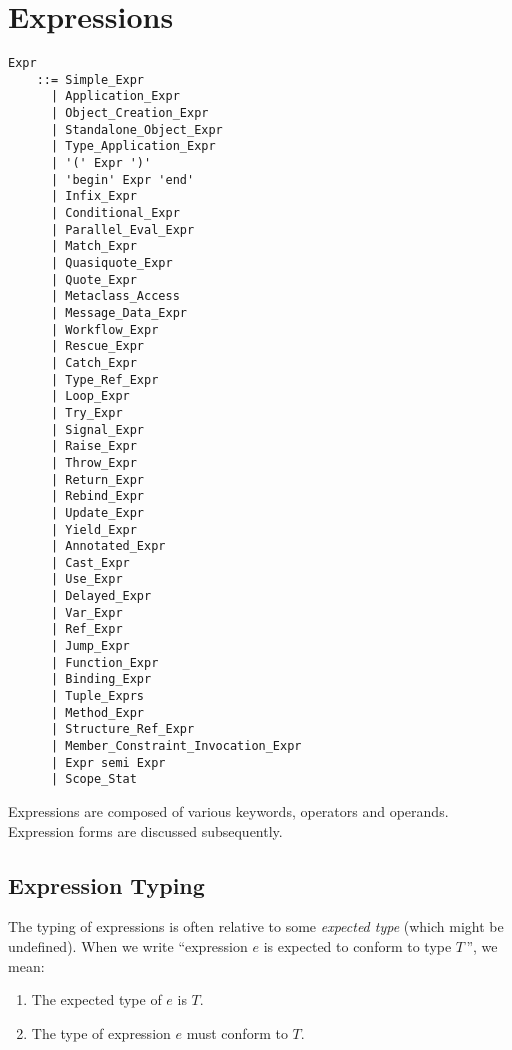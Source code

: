 
\chapter{Expressions}

\minitoc

\newpage

\grammar\begin{lstlisting}
Expr        
    ::= Simple_Expr
      | Application_Expr
      | Object_Creation_Expr
      | Standalone_Object_Expr
      | Type_Application_Expr
      | '(' Expr ')'
      | 'begin' Expr 'end'
      | Infix_Expr
      | Conditional_Expr
      | Parallel_Eval_Expr
      | Match_Expr
      | Quasiquote_Expr
      | Quote_Expr
      | Metaclass_Access
      | Message_Data_Expr
      | Workflow_Expr
      | Rescue_Expr
      | Catch_Expr
      | Type_Ref_Expr
      | Loop_Expr
      | Try_Expr
      | Signal_Expr
      | Raise_Expr
      | Throw_Expr
      | Return_Expr
      | Rebind_Expr
      | Update_Expr
      | Yield_Expr
      | Annotated_Expr
      | Cast_Expr
      | Use_Expr
      | Delayed_Expr
      | Var_Expr
      | Ref_Expr
      | Jump_Expr
      | Function_Expr
      | Binding_Expr
      | Tuple_Exprs
      | Method_Expr
      | Structure_Ref_Expr
      | Member_Constraint_Invocation_Expr
      | Expr semi Expr
      | Scope_Stat
\end{lstlisting}

Expressions are composed of various keywords, operators and operands. Expression forms are discussed subsequently. 







\section{Expression Typing}
\label{sec:expression-typing}

The typing of expressions is often relative to some {\em expected type} (which might be undefined). When we write ``expression $e$ is expected to conform to type $T$\,'', we mean:
\begin{enumerate}
  \item The expected type of $e$ is $T$.
  \item The type of expression $e$ must conform to $T$. 
\end{enumerate}

